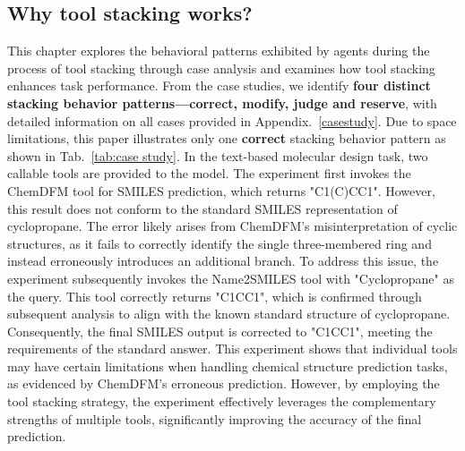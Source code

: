 \subsection{Why tool stacking works?}
\label{6.4}
This chapter explores the behavioral patterns exhibited by agents during the process of tool stacking through case analysis and examines how tool stacking enhances task performance. From the case studies, we identify \textbf{four distinct stacking behavior patterns—correct, modify, judge and reserve}, with detailed information on all cases provided in Appendix.~\ref{casestudy}. Due to space limitations, this paper illustrates only one \textbf{correct} stacking behavior pattern as shown in Tab.~\ref{tab:case study}.
In the text-based molecular design task, two callable tools are provided to the model. The experiment first invokes the ChemDFM tool for SMILES prediction, which returns "C1(C)CC1". However, this result does not conform to the standard SMILES representation of cyclopropane. The error likely arises from ChemDFM's misinterpretation of cyclic structures, as it fails to correctly identify the single three-membered ring and instead erroneously introduces an additional branch. To address this issue, the experiment subsequently invokes the Name2SMILES tool with "Cyclopropane" as the query. This tool correctly returns "C1CC1", which is confirmed through subsequent analysis to align with the known standard structure of cyclopropane. Consequently, the final SMILES output is corrected to "C1CC1", meeting the requirements of the standard answer.
This experiment shows that individual tools may have certain limitations when handling chemical structure prediction tasks, as evidenced by ChemDFM's erroneous prediction. However, by employing the tool stacking strategy, the experiment effectively leverages the complementary strengths of multiple tools, significantly improving the accuracy of the final prediction.



